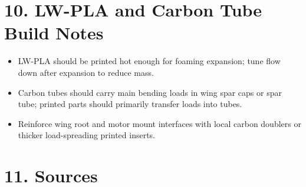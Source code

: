\documentclass[11pt]{article}
\begin{document}
\section*{10. LW-PLA and Carbon Tube Build Notes}
\begin{itemize}
  \item LW-PLA should be printed hot enough for foaming expansion; tune flow down after expansion to reduce mass.
  \item Carbon tubes should carry main bending loads in wing spar caps or spar tube; printed parts should primarily transfer loads into tubes.
  \item Reinforce wing root and motor mount interfaces with local carbon doublers or thicker load-spreading printed inserts.
\end{itemize}

\section*{11. Sources}
\end{document}
